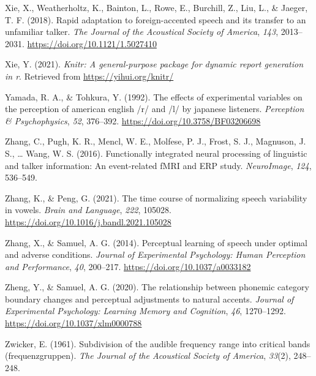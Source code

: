 \documentclass[
  11pt,
  english,
  man,floatsintext]{apa6}
\newlength{\cslhangindent}
\newlength{\cslentryspacingunit} %
\newenvironment{CSLReferences}[2] %
 {%
  \setlength{\parindent}{0pt}
  \ifodd #1
  \let\oldpar\par
  \def\par{\hangindent=\cslhangindent\oldpar}
  \fi
  \setlength{\parskip}{#2\cslentryspacingunit}
 }%
 {}
\begin{document}
\begin{CSLReferences}{1}{0}
\leavevmode{}%
Xie, X., Weatherholtz, K., Bainton, L., Rowe, E., Burchill, Z., Liu, L., \& Jaeger, T. F. (2018). Rapid adaptation to foreign-accented speech and its transfer to an unfamiliar talker. \emph{The Journal of the Acoustical Society of America}, \emph{143}, 2013--2031. \url{https://doi.org/10.1121/1.5027410}

\leavevmode{}%
Xie, Y. (2021). \emph{Knitr: A general-purpose package for dynamic report generation in r}. Retrieved from \url{https://yihui.org/knitr/}

\leavevmode{}%
Yamada, R. A., \& Tohkura, Y. (1992). The effects of experimental variables on the perception of american english /r/ and /l/ by japanese listeners. \emph{Perception \& Psychophysics}, \emph{52}, 376--392. \url{https://doi.org/10.3758/BF03206698}

\leavevmode{}%
Zhang, C., Pugh, K. R., Mencl, W. E., Molfese, P. J., Frost, S. J., Magnuson, J. S., \ldots{} Wang, W. S. (2016). Functionally integrated neural processing of linguistic and talker information: An event-related fMRI and ERP study. \emph{NeuroImage}, \emph{124}, 536--549.

\leavevmode{}%
Zhang, K., \& Peng, G. (2021). The time course of normalizing speech variability in vowels. \emph{Brain and Language}, \emph{222}, 105028. \url{https://doi.org/10.1016/j.bandl.2021.105028}

\leavevmode{}%
Zhang, X., \& Samuel, A. G. (2014). Perceptual learning of speech under optimal and adverse conditions. \emph{Journal of Experimental Psychology: Human Perception and Performance}, \emph{40}, 200--217. \url{https://doi.org/10.1037/a0033182}

\leavevmode{}%
Zheng, Y., \& Samuel, A. G. (2020). The relationship between phonemic category boundary changes and perceptual adjustments to natural accents. \emph{Journal of Experimental Psychology: Learning Memory and Cognition}, \emph{46}, 1270--1292. \url{https://doi.org/10.1037/xlm0000788}

\leavevmode{}%
Zwicker, E. (1961). Subdivision of the audible frequency range into critical bands (frequenzgruppen). \emph{The Journal of the Acoustical Society of America}, \emph{33}(2), 248--248.

\end{CSLReferences}
\end{document}

